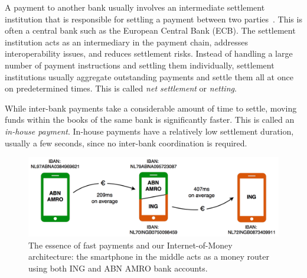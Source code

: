 A payment to another bank usually involves an intermediate settlement institution that is responsible for settling a payment between two parties~\cite{kokkola2011payment}.
This is often a central bank such as the European Central Bank (ECB).
The settlement institution acts as an intermediary in the payment chain, addresses interoperability issues, and reduces settlement risks.
Instead of handling a large number of payment instructions and settling them individually, settlement institutions usually aggregate outstanding payments and settle them all at once on predetermined times.
This is called \emph{net settlement} or \emph{netting}.

While inter-bank payments take a considerable amount of time to settle, moving funds within the books of the same bank is significantly faster.
This is called an \emph{in-house payment}.
In-house payments have a relatively low settlement duration, usually a few seconds, since no inter-bank coordination is required.



\begin{figure}[t]
	\centering
	\includegraphics[width=\textwidth]{iom/assets/internet_of_money.png}
	\caption{The essence of fast payments and our Internet-of-Money architecture: the smartphone in the middle acts as a money router using both ING and ABN AMRO bank accounts.}
	\label{fig:internet_of_money}
\end{figure}

